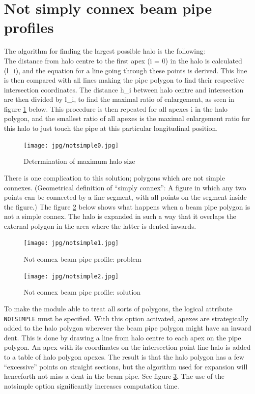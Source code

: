 \section{Not simply connex beam pipe profiles} 
\label{sec:notconnex}
The algorithm for finding the largest possible halo is the following: \\
The distance from halo centre to the first apex (i = 0)
in the halo is calculated (l\_i), and the equation for a line going
through these points is derived. This line is then compared with all
lines making the pipe polygon to find their respective intersection
coordinates. The distance h\_i between halo centre and intersection are
then divided by l\_i, to find the maximal ratio of enlargement, as seen
in figure \ref{fig:notsimple0} below. 
This procedure is then repeated for all apexes i in the halo
polygon, and the smallest ratio  of all apexes is the maximal
enlargement ratio for this halo to just touch the pipe at this
particular longitudinal position. 

\begin{figure}[h]
  \centering
  \texttt{[image: jpg/notsimple0.jpg]}
  \caption{Determination of maximum halo size}
  \label{fig:notsimple0}
\end{figure}

There is one complication to this solution; polygons which are not
simple connexes. (Geometrical definition of ``simply connex'': A figure
in which any two points can be connected by a line segment, with all
points on the segment inside the figure.) The figure \ref{fig:notsimple1}
below shows what happens when a beam pipe polygon is not a simple
connex. The halo is expanded in such a way that it overlaps the external
polygon in the area where the latter is dented inwards. 

\begin{figure}[htb]
  \centering
  \texttt{[image: jpg/notsimple1.jpg]}
  \caption{Not connex beam pipe profile: problem}
  \label{fig:notsimple1}
\end{figure}

\begin{figure}[htb]
  \centering
  \texttt{[image: jpg/notsimple2.jpg]}    
  \caption{Not connex beam pipe profile: solution}
  \label{fig:notsimple2}
\end{figure}

To make the module able to treat all sorts of polygons, the logical
attribute \texttt{NOTSIMPLE} must be specified. With this option activated,
apexes are strategically added to the halo polygon wherever the beam pipe
polygon might have an inward dent. This is done by drawing a line from
halo centre to each apex on the pipe polygon. An apex with its
coordinates on the intersection point line-halo is added to a table of
halo polygon apexes. The result is that the halo polygon has a few
``excessive'' points on straight sections, but the algorithm used for
expansion will henceforth not miss a dent in the beam pipe. See
figure \ref{fig:notsimple2}. The use of the
notsimple option significantly increases computation time. 
